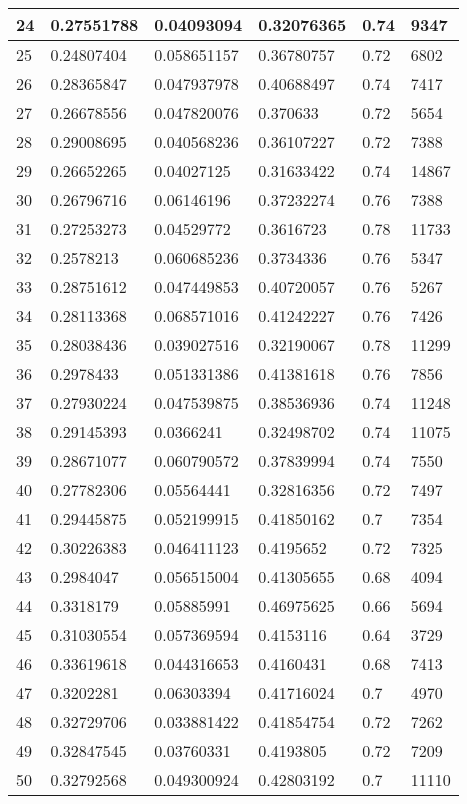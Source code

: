 \begin{longtable}{|l|l|l|l|l|l|}
24 & 0.27551788 & 0.04093094 & 0.32076365 & 0.74 & 9347 \\ \hline 
25 & 0.24807404 & 0.058651157 & 0.36780757 & 0.72 & 6802 \\ \hline 
26 & 0.28365847 & 0.047937978 & 0.40688497 & 0.74 & 7417 \\ \hline 
27 & 0.26678556 & 0.047820076 & 0.370633 & 0.72 & 5654 \\ \hline 
28 & 0.29008695 & 0.040568236 & 0.36107227 & 0.72 & 7388 \\ \hline 
29 & 0.26652265 & 0.04027125 & 0.31633422 & 0.74 & 14867 \\ \hline 
30 & 0.26796716 & 0.06146196 & 0.37232274 & 0.76 & 7388 \\ \hline 
31 & 0.27253273 & 0.04529772 & 0.3616723 & 0.78 & 11733 \\ \hline 
32 & 0.2578213 & 0.060685236 & 0.3734336 & 0.76 & 5347 \\ \hline 
33 & 0.28751612 & 0.047449853 & 0.40720057 & 0.76 & 5267 \\ \hline 
34 & 0.28113368 & 0.068571016 & 0.41242227 & 0.76 & 7426 \\ \hline 
35 & 0.28038436 & 0.039027516 & 0.32190067 & 0.78 & 11299 \\ \hline 
36 & 0.2978433 & 0.051331386 & 0.41381618 & 0.76 & 7856 \\ \hline 
37 & 0.27930224 & 0.047539875 & 0.38536936 & 0.74 & 11248 \\ \hline 
38 & 0.29145393 & 0.0366241 & 0.32498702 & 0.74 & 11075 \\ \hline 
39 & 0.28671077 & 0.060790572 & 0.37839994 & 0.74 & 7550 \\ \hline 
40 & 0.27782306 & 0.05564441 & 0.32816356 & 0.72 & 7497 \\ \hline 
41 & 0.29445875 & 0.052199915 & 0.41850162 & 0.7 & 7354 \\ \hline 
42 & 0.30226383 & 0.046411123 & 0.4195652 & 0.72 & 7325 \\ \hline 
43 & 0.2984047 & 0.056515004 & 0.41305655 & 0.68 & 4094 \\ \hline 
44 & 0.3318179 & 0.05885991 & 0.46975625 & 0.66 & 5694 \\ \hline 
45 & 0.31030554 & 0.057369594 & 0.4153116 & 0.64 & 3729 \\ \hline 
46 & 0.33619618 & 0.044316653 & 0.4160431 & 0.68 & 7413 \\ \hline 
47 & 0.3202281 & 0.06303394 & 0.41716024 & 0.7 & 4970 \\ \hline 
48 & 0.32729706 & 0.033881422 & 0.41854754 & 0.72 & 7262 \\ \hline 
49 & 0.32847545 & 0.03760331 & 0.4193805 & 0.72 & 7209 \\ \hline 
50 & 0.32792568 & 0.049300924 & 0.42803192 & 0.7 & 11110 \\ \hline 
\end{longtable}